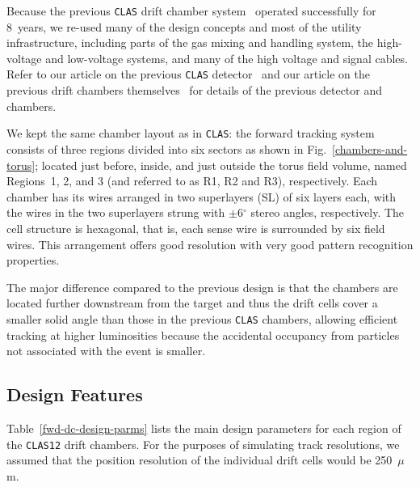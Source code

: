 Because the previous {\tt CLAS} drift chamber system~\cite{dcnim} operated 
successfully for 8~years, we re-used many of the design concepts and 
most of the utility infrastructure, including
parts of the gas mixing and handling system, the high-voltage 
and low-voltage systems, and many of the high voltage and signal cables. 
Refer to our 
article on the previous {\tt CLAS} detector~\cite{clasnim} and our article 
on the previous drift chambers themselves~\cite{dcnim} for details of the 
previous detector and chambers.  

We kept the same chamber layout as in {\tt CLAS}:
the forward tracking system consists of three regions divided into six
sectors as shown in Fig.~\ref{chambers-and-torus}; located just before, inside, 
and just outside the torus field volume, named Regions~1, 2, 
and 3 (and referred to as R1, R2 and R3), respectively.  
Each chamber has its wires arranged in two superlayers (SL) of
six layers each, with the wires in the two superlayers strung with 
$\pm$6$^\circ$ stereo angles, respectively.  The cell structure is 
hexagonal, that is, each sense wire is surrounded by six field wires.  This 
arrangement offers good 
resolution with very good pattern recognition properties.  

The major difference compared to the previous design is that the 
chambers are located further downstream from the target and thus the drift
cells cover a smaller solid angle than those in the previous {\tt CLAS} 
chambers, allowing efficient tracking at higher luminosities because the 
accidental occupancy from particles not associated with the event is smaller.  

\subsection{Design Features}

Table~\ref{fwd-dc-design-parms} lists the main design parameters for each 
region of the {\tt CLAS12} drift chambers.  For the purposes of simulating 
track resolutions, we assumed that the position resolution of the individual 
drift cells would be 250~$\mu$m.  

